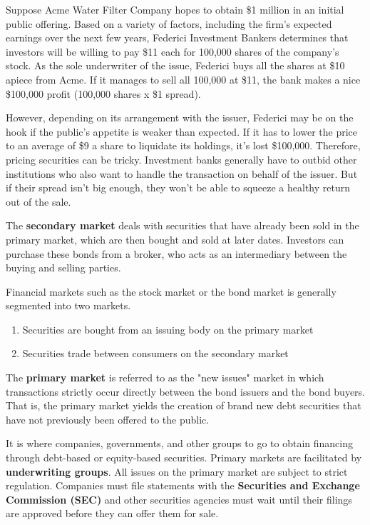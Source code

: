 \documentclass{article}
\begin{document}
    \begin{example}
      Suppose Acme Water Filter Company hopes to obtain \$1 million in an initial public offering. Based on a variety of factors, including the firm’s expected earnings over the next few years, Federici Investment Bankers determines that investors will be willing to pay \$11 each for 100,000 shares of the company’s stock. As the sole underwriter of the issue, Federici buys all the shares at \$10 apiece from Acme. If it manages to sell all 100,000 at \$11, the bank makes a nice \$100,000 profit (100,000 shares x \$1 spread). 

      However, depending on its arrangement with the issuer, Federici may be on the hook if the public’s appetite is weaker than expected. If it has to lower the price to an average of \$9 a share to liquidate its holdings, it’s lost \$100,000. Therefore, pricing securities can be tricky. Investment banks generally have to outbid other institutions who also want to handle the transaction on behalf of the issuer. But if their spread isn’t big enough, they won’t be able to squeeze a healthy return out of the sale. 
    \end{example}

    \begin{definition}
      The \textbf{secondary market} deals with securities that have already been sold in the primary market, which are then bought and sold at later dates. Investors can purchase these bonds from a broker, who acts as an intermediary between the buying and selling parties. 
    \end{definition}

    Financial markets such as the stock market or the bond market is generally segmented into two markets. 
    \begin{enumerate}
      \item Securities are bought from an issuing body on the primary market
      \item Securities trade between consumers on the secondary market
    \end{enumerate}

    \begin{definition}
      The \textbf{primary market} is referred to as the "new issues" market in which transactions strictly occur directly between the bond issuers and the bond buyers. That is, the primary market yields the creation of brand new debt securities that have not previously been offered to the public. 

      It is where companies, governments, and other groups to go to obtain financing through debt-based or equity-based securities. Primary markets are facilitated by \textbf{underwriting groups}. All issues on the primary market are subject to strict regulation. Companies must file statements with the \textbf{Securities and Exchange Commission (SEC)} and other securities agencies must wait until their filings are approved before they can offer them for sale. 
    \end{definition}
\end{document}
